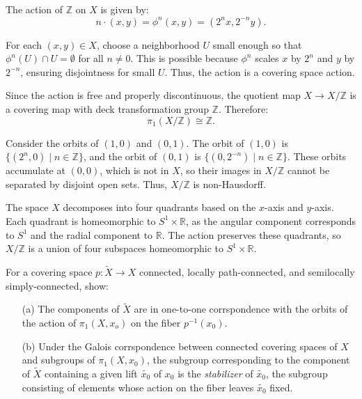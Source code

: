 \documentclass[12pt]{article}
\begin{document}
\begin{newproof}
  The action of $\mathbb{Z}$ on $X$ is given by:
$$ n \cdot (x, y) = \phi^n(x, y) = (2^n x, 2^{-n} y). $$ 
\par For each $(x, y) \in X$, choose a neighborhood $U$ small enough so that 
$\phi^n(U) \cap U = \emptyset$ for all $n \neq 0$. This is possible because $\phi^n$ scales $x$ 
by $2^n$ and $y$ by $2^{-n}$, ensuring disjointness for small $U$. Thus, the action is a covering space action.
\par Since the action is free and properly discontinuous, the quotient map $X \to X / \mathbb{Z}$ is a covering map 
with deck transformation group $\mathbb{Z}$. Therefore:
$$ \pi_1(X / \mathbb{Z}) \cong \mathbb{Z}. $$
\par Consider the orbits of $(1, 0)$ and $(0, 1)$. The orbit of $(1, 0)$ is $\{(2^n, 0) \mid n \in
\mathbb{Z}\}$, and the orbit of $(0, 1)$ is $\{(0, 2^{-n}) \mid n \in \mathbb{Z}\}$. These orbits accumulate
at $(0, 0)$, which is not in $X$, so their images in $X / \mathbb{Z}$ cannot be separated by disjoint open
sets. Thus, $X / \mathbb{Z}$ is non-Hausdorff.
\par The space $X$ decomposes into four quadrants based on the $x$-axis and $y$-axis. Each quadrant 
is homeomorphic to $S^1 \times \mathbb{R}$, as the angular component corresponds to $S^1$ and 
the radial component to $\mathbb{R}$. The action preserves these quadrants, so $X / \mathbb{Z}$ is a 
union of four subspaces homeomorphic to $S^1 \times \mathbb{R}$.
\end{newproof}

\begin{statement}
  For a covering space $p: \tilde{X} \to X$ connected, locally path-connected, and semilocally simply-connected, 
  show:
  \begin{itemize}
    \item[(a)] The components of $\tilde{X}$ are in one-to-one corrspondence with the orbits of the action of 
      $\pi_1(X,x_o)$ on the fiber $p^{-1}(x_0)$.
    \item[(b)] Under the Galois corrspondence between connected covering spaces of $X$ and subgroups 
      of $\pi_1(X,x_0)$, the subgroup corresponding to the component of $\tilde{X}$ containing
      a given lift $\tilde{x_0}$ of $x_0$ is the \textit{stabilizer} of $\tilde{x_0}$, the 
      subgroup consisting of elements whose action on the fiber leaves $\tilde{x_0}$ fixed.
  \end{itemize}
\end{statement}
\end{document}
